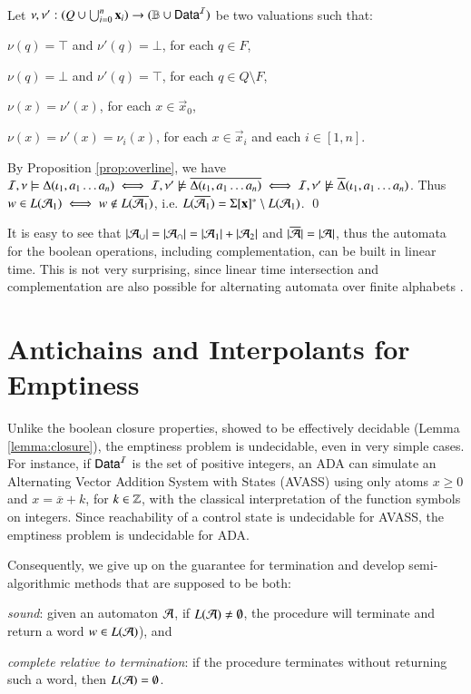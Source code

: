 \documentclass{llncs}
\begin{document}
{\[\begin{array}{rcll}
  \end{array}\]
  Let $\nu,\nu' : (Q \cup \bigcup_{i=0}^n\mathbf x_i) \rightarrow (\mathbb{B}
  \cup \mathsf{Data}^{\mathcal{I}})$ be two valuations such that: \begin{compactitem}
  \item $\nu(q) = \top$ and $\nu'(q) = \bot$, for each $q \in F$, 
  \item $\nu(q) = \bot$ and $\nu'(q) = \top$, for each $q \in Q \setminus F$, 
  \item $\nu(x) = \nu'(x)$, for each $x \in \vec{x}_0$, 
  \item $\nu(x) = \nu'(x) = \nu_i(x)$, for each $x \in \vec{x}_i$ and each $i
    \in [1,n]$.
  \end{compactitem}
  By Proposition \ref{prop:overline}, we have $\mathcal{I},\nu \models
  \Delta(\iota_1,a_1 \ldots a_n) \iff \mathcal{I},\nu' \not\models
  \overline{\Delta(\iota_1,a_1 \ldots a_n)} \iff \mathcal{I},\nu' \not\models
  \overline{\Delta}(\iota_1,a_1 \ldots a_n)$. Thus $w \in L(\mathcal{A}_1) \iff
  w \not\in L(\overline{\mathcal{A}_1})$, i.e. $L(\overline{\mathcal{A}_1}) =
  \Sigma[\mathbf x]^* \setminus L(\mathcal{A}_1)$. \qed}

It is easy to see that ${|{\mathcal{A}_\cup}|} = {|{\mathcal{A}_\cap}|} = {|{\mathcal{A}_1}|} +
{|{\mathcal{A}_2}|}$ and ${|{\overline{\mathcal{A}}}|} = {|{\mathcal{A}}|}$, thus the automata
for the boolean operations, including complementation, can be built in
linear time. This is not very surprising, since linear time
intersection and complementation are also possible for alternating
automata over finite alphabets \cite{ChandraKozenStockmeyer81}.

\section{Antichains and Interpolants for Emptiness}

Unlike the boolean closure properties, showed to be effectively
decidable (Lemma \ref{lemma:closure}), the emptiness problem is
undecidable, even in very simple cases. For instance, if $\mathsf{Data}^{\mathcal{I}}$ is
the set of positive integers, an ADA can simulate an Alternating
Vector Addition System with States (AVASS) \cite{LazicSchmitz14} using
only atoms $x \geq 0$ and $x = \overline{x} + k$, for $k \in {\bf \mathbb{Z}}$,
with the classical interpretation of the function symbols on
integers. Since reachability of a control state is undecidable for
AVASS, the emptiness problem is undecidable for ADA.

Consequently, we give up on the guarantee for termination and develop
semi-algorithmic methods that are supposed to be
both: \begin{compactenum}
\item \emph{sound}: given an automaton $\mathcal{A}$, if $L(\mathcal{A}) \neq\emptyset$,
  the procedure will terminate and return a word $w \in L(\mathcal{A})$), and
%
\item \emph{complete relative to termination}: if the procedure terminates
  without returning such a word, then $L(\mathcal{A}) = \emptyset$. 
\end{compactenum}
\end{document}
